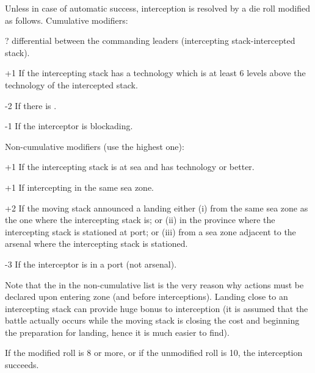 Unless in case of automatic success, interception is resolved by a die roll
modified as follows. Cumulative modifiers:
\begin{modlist}
\item[\textplusminus?] \Man differential between the commanding leaders
  (intercepting stack-intercepted stack).
\item[+1] If the intercepting stack has a technology which is at least 6
  levels above the technology of the intercepted stack.
\item[-2] If there is .
\item[-1] If the interceptor is blockading.
\end{modlist}
Non-cumulative modifiers (use the highest one):
\begin{modlist}
\item[+1] If the intercepting stack is at sea and has technology \TTD or
  better.
\item[+1] If intercepting in the same sea zone.
\item[+2] If the moving stack announced a landing either (i) from the same sea
  zone as the one where the intercepting stack is; or (ii) in the province
  where the intercepting stack is stationed at port; or (iii) from a sea zone
  adjacent to the arsenal where the intercepting stack is stationed.
\item[-3] If the interceptor is in a port (not arsenal).
\end{modlist}

Note that the  in the non-cumulative list is the very reason why
actions must be declared upon entering zone (and before
interceptions). Landing close to an intercepting stack can provide huge bonus
to interception (it is assumed that the battle actually occurs while the
moving stack is closing the cost and beginning the preparation for landing,
hence it is much easier to find).

If the modified roll is 8 or more, or if the unmodified roll is 10, the
interception succeeds.

